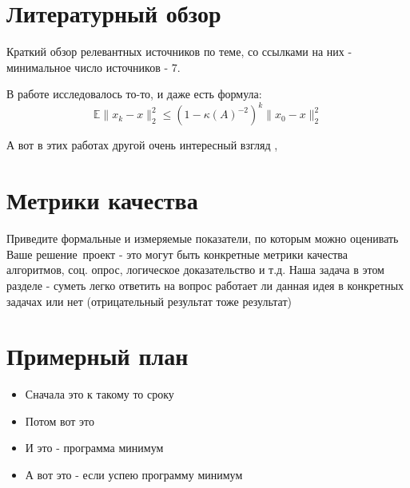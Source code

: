 \documentclass[]{scrartcl}
\begin{document}
\section{Литературный обзор}
Краткий обзор релевантных источников по теме, со ссылками на них - минимальное число источников - 7.


В работе \cite{strohmer2009randomized} исследовалось то-то, и даже есть формула:
\begin{equation}
\mathbb{E} \|x_k - x\|_2^2 \leq \left(1 - \kappa (A) ^{-2}\right)^k \|x_0 - x\|_2^2
\end{equation}


А вот в этих работах другой очень интересный взгляд \cite{gower2015randomized}, \cite{dai2014randomized} 

\section{Метрики качества}
Приведите формальные и измеряемые показатели, по которым можно оценивать Ваше решение\ проект - это могут быть конкретные метрики качества алгоритмов, соц. опрос, логическое доказательство и т.д. Наша задача в этом разделе - суметь легко ответить на вопрос работает ли данная идея в конкретных задачах или нет (отрицательный результат тоже результат)

\section{Примерный план}
\begin{itemize}
	\item Сначала это к такому то сроку
	\item Потом вот это
	\item И это - программа минимум
	\item А вот это  - если успею программу минимум
\end{itemize}


\end{document}
